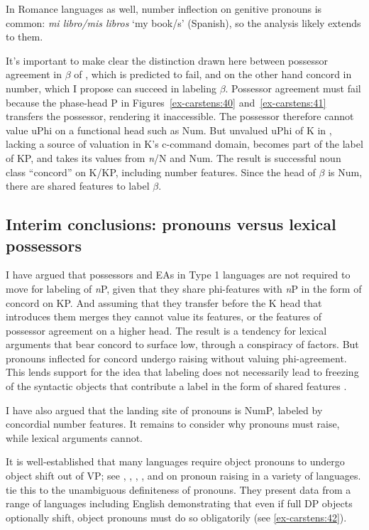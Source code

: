 \documentclass[output=paper
,modfonts
,nonflat]{langsci/langscibook}
\begin{document}
In Romance languages as well, number inflection on genitive pronouns is common: \textit{mi libro/mis libros} ‘my book/s’ (Spanish), so the analysis likely extends to them.

It’s important to make clear the distinction drawn here between possessor agreement in $\beta$ of , which is predicted to fail, and on the other hand concord in number, which I propose can succeed in labeling $\beta$. Possessor agreement must fail because the phase-head P in Figures~\ref{ex-carstens:40} and~\ref{ex-carstens:41} transfers the possessor, rendering it inaccessible. The possessor therefore cannot value uPhi on a functional head such as Num. But unvalued uPhi of K in , lacking a source of valuation in K’s c-command domain, becomes part of the label of KP, and takes its values from \textit{n}/N and Num. The result is successful noun class “concord” on K/KP, including number features. Since the head of $\beta$ is Num, there are shared features to label $\beta$.  

\subsection{Interim conclusions: pronouns versus lexical possessors} \label{sec-carstens:5.4}
I have argued that possessors and EAs in Type 1 languages are not required to move for labeling of \textit{n}P, given that they share phi-features with \textit{n}P in the form of concord on KP. And assuming that they transfer before the K head that introduces them merges they cannot value its features, or the features of possessor agreement on a higher head. The result is a tendency for lexical arguments that bear concord to surface low, through a conspiracy of factors. But pronouns inflected for concord undergo raising without valuing phi-agreement. This lends support for the idea that labeling does not necessarily lead to freezing of the syntactic objects that contribute a label in the form of shared features \citep{Chomsky2015}. 

I have also argued that the landing site of pronouns is NumP, labeled by concordial number features. It remains to consider why pronouns must raise, while lexical arguments cannot. 

It is well-established that many languages require object pronouns to undergo object shift out of VP; see \citet{Diesing1992, Diesing1997}, \citet{Diesing_Jelinek1995}, \citet{Roberts_Shlonsky1996}, \citet{Cardinaletti_Starke1999}, and \citet{Holmberg1999} on pronoun raising in a variety of languages.  \citet{Diesing_Jelinek1995} tie this to the unambiguous definiteness of pronouns. They present data from a range of languages including English demonstrating that even if full DP objects optionally shift, object pronouns must do so obligatorily (see \ref{ex-carstens:42}). 
\end{document}
